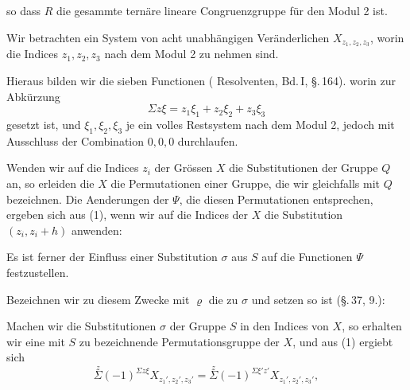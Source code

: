 
so dass $R$ die gesammte ternäre lineare Congruenzgruppe für den Modul 2 ist.

Wir betrachten ein System von acht unabhängigen Veränderlichen $X_{z_1,z_2,z_3}$, worin die Indices $z_1, z_2, z_3$ nach dem Modul 2 zu nehmen sind.

Hieraus bilden wir die sieben Functionen ( Resolventen, Bd.\,I, \S.\,164).
worin zur Abkürzung
\[
\Sigma z\xi = z_1\xi_1 + z_2\xi_2 + z_3\xi_3
\]
gesetzt ist, und $\xi_1, \xi_2, \xi_3$ je ein volles Restsystem nach dem Modul 2, jedoch mit Ausschluss der Combination $0, 0, 0$ durchlaufen.

Wenden wir auf die Indices $z_i$ der Grössen $X$ die Substitutionen der Gruppe $Q$ an, so erleiden die $X$ die Permutationen einer Gruppe, die wir gleichfalls mit $Q$ bezeichnen. Die Aenderungen der $\Psi$, die diesen Permutationen entsprechen, ergeben sich aus (1), wenn wir auf die Indices der $X$ die Substitution $(z_i, z_i+h)$ anwenden:


Es ist ferner der Einfluss einer Substitution $\sigma$ aus $S$ auf die Functionen $\Psi$ festzustellen.

Bezeichnen wir zu diesem Zwecke mit $\varrho$ die  zu $\sigma$ und setzen
so ist (\S.\,37, 9.):

Machen wir die Substitutionen $\sigma$ der Gruppe $S$ in den Indices von $X$, so erhalten wir eine mit $S$ zu bezeichnende Permutationsgruppe der $X$, und aus (1) ergiebt sich
\[
\overset{z}{\Sigma} (-1)^{\Sigma z\xi} X_{z_1', z_2', z_3'} = \overset{z}{\Sigma} (-1)^{\Sigma \xi' z'} X_{z_1', z_2', z_3'},
\]
